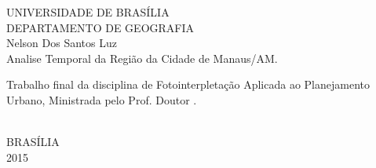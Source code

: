\begin{titlepage}
    \begin{center}
        {\large UNIVERSIDADE DE BRASÍLIA} \\
        {\large DEPARTAMENTO DE GEOGRAFIA} \\[3.3cm]
        {\large Nelson Dos Santos Luz} \\[3.3cm]
        {\Huge Analise Temporal da Região da Cidade de Manaus/AM.} \\[3.6cm]
        \hspace{.45\textwidth} %
        \begin{minipage}{.5\textwidth}
                Trabalho final da disciplina de Fotointerpletação Aplicada ao Planejamento Urbano, Ministrada pelo Prof. Doutor .
        \end{minipage}\\[3.3cm]
        \vfill
        {\large BRASÍLIA} \\
        {\large 2015}
    \end{center}
\end{titlepage}